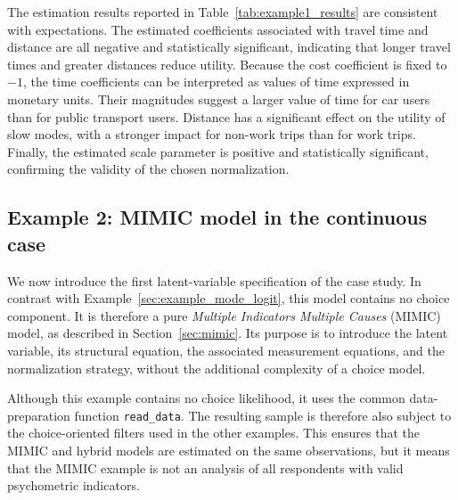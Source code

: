 \documentclass[12pt,a4paper]{article}
\let\OrigUnderscore\_
\def\_{\OrigUnderscore\penalty0\hspace{0pt}}%
\begin{document}
The estimation results reported in Table~\ref{tab:example1_results}
are consistent with expectations. The estimated coefficients
associated with travel time and distance are all negative and
statistically significant, indicating that longer travel times and
greater distances reduce utility. Because the cost coefficient is
fixed to \(-1\), the time coefficients can be interpreted as values of
time expressed in monetary units. Their magnitudes suggest a larger
value of time for car users than for public transport users. Distance
has a significant effect on the utility of slow modes, with a stronger
impact for non-work trips than for work trips. Finally, the estimated
scale parameter is positive and statistically significant, confirming
the validity of the chosen normalization.

\FloatBarrier

\subsection{Example 2: MIMIC model in the continuous case}
\label{sec:example_mimic_gauss}

We now introduce the first latent-variable specification of the case
study. In contrast with Example~\ref{sec:example_mode_logit}, this
model contains no choice component. It is therefore a pure
\emph{Multiple Indicators Multiple Causes} (MIMIC) model, as described
in Section~\ref{sec:mimic}. Its purpose is to introduce the latent
variable, its structural equation, the associated measurement
equations, and the normalization strategy, without the additional
complexity of a choice model.

Although this example contains no choice likelihood, it uses the common
data-preparation function \texttt{read\_data}. The resulting sample is
therefore also subject to the choice-oriented filters used in the other
examples. This ensures that the MIMIC and hybrid models are estimated
on the same observations, but it means that the MIMIC example is not an
analysis of all respondents with valid psychometric indicators.
\end{document}
